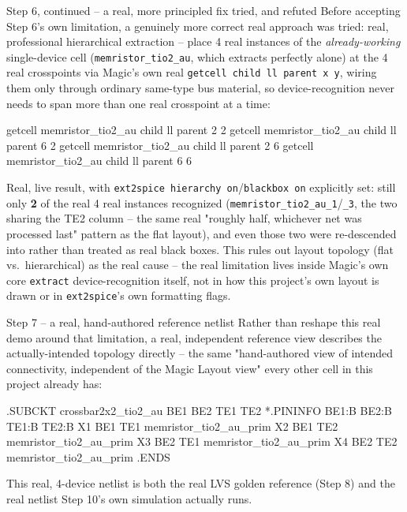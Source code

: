 \documentclass[aspectratio=169,9pt]{beamer}
\begin{document}
\begin{frame}[fragile]{Step 6, continued -- a real, more principled fix tried, and refuted}
Before accepting Step 6's own limitation, a genuinely more correct
real approach was tried: real, professional hierarchical extraction
-- place 4 real instances of the \emph{already-working} single-device
cell (\texttt{memristor\_tio2\_au}, which extracts perfectly alone)
at the 4 real crosspoints via Magic's own real \texttt{getcell child
ll parent x y}, wiring them only through ordinary same-type bus
material, so device-recognition never needs to span more than one
real crosspoint at a time:
\begin{cli}
getcell memristor_tio2_au child ll parent 2 2
getcell memristor_tio2_au child ll parent 6 2
getcell memristor_tio2_au child ll parent 2 6
getcell memristor_tio2_au child ll parent 6 6
\end{cli}
\footnotesize
Real, live result, with \texttt{ext2spice hierarchy on}/\texttt{blackbox
on} explicitly set: still only \textbf{2} of the real 4 real instances
recognized (\texttt{memristor\_tio2\_au\_1}/\texttt{\_3}, the two
sharing the TE2 column -- the same real "roughly half, whichever net
was processed last" pattern as the flat layout), and even those two
were re-descended into rather than treated as real black boxes. This
rules out layout topology (flat vs.\ hierarchical) as the real cause --
the real limitation lives inside Magic's own core \texttt{extract}
device-recognition itself, not in how this project's own layout is
drawn or in \texttt{ext2spice}'s own formatting flags.
\end{frame}

\begin{frame}[fragile]{Step 7 -- a real, hand-authored reference netlist}
Rather than reshape this real demo around that limitation, a real,
independent reference view describes the actually-intended topology
directly -- the same "hand-authored view of intended connectivity,
independent of the Magic Layout view" every other cell in this
project already has:
\begin{cli}
.SUBCKT crossbar2x2_tio2_au BE1 BE2 TE1 TE2
*.PININFO BE1:B BE2:B TE1:B TE2:B
X1 BE1 TE1 memristor_tio2_au_prim
X2 BE1 TE2 memristor_tio2_au_prim
X3 BE2 TE1 memristor_tio2_au_prim
X4 BE2 TE2 memristor_tio2_au_prim
.ENDS
\end{cli}
\footnotesize
This real, 4-device netlist is both the real LVS golden reference
(Step 8) and the real netlist Step 10's own simulation actually runs.
\end{frame}
\end{document}
